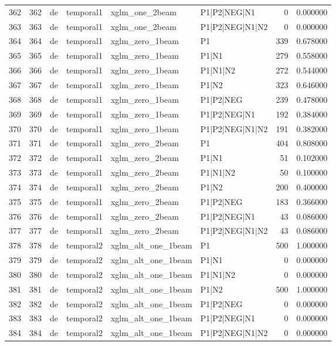 \begin{tabular}{lrllllrr}
362 & 362 & de & temporal1 & xglm_one_2beam & P1|P2|NEG|N1 & 0 & 0.000000 \\
363 & 363 & de & temporal1 & xglm_one_2beam & P1|P2|NEG|N1|N2 & 0 & 0.000000 \\
364 & 364 & de & temporal1 & xglm_zero_1beam & P1 & 339 & 0.678000 \\
365 & 365 & de & temporal1 & xglm_zero_1beam & P1|N1 & 279 & 0.558000 \\
366 & 366 & de & temporal1 & xglm_zero_1beam & P1|N1|N2 & 272 & 0.544000 \\
367 & 367 & de & temporal1 & xglm_zero_1beam & P1|N2 & 323 & 0.646000 \\
368 & 368 & de & temporal1 & xglm_zero_1beam & P1|P2|NEG & 239 & 0.478000 \\
369 & 369 & de & temporal1 & xglm_zero_1beam & P1|P2|NEG|N1 & 192 & 0.384000 \\
370 & 370 & de & temporal1 & xglm_zero_1beam & P1|P2|NEG|N1|N2 & 191 & 0.382000 \\
371 & 371 & de & temporal1 & xglm_zero_2beam & P1 & 404 & 0.808000 \\
372 & 372 & de & temporal1 & xglm_zero_2beam & P1|N1 & 51 & 0.102000 \\
373 & 373 & de & temporal1 & xglm_zero_2beam & P1|N1|N2 & 50 & 0.100000 \\
374 & 374 & de & temporal1 & xglm_zero_2beam & P1|N2 & 200 & 0.400000 \\
375 & 375 & de & temporal1 & xglm_zero_2beam & P1|P2|NEG & 183 & 0.366000 \\
376 & 376 & de & temporal1 & xglm_zero_2beam & P1|P2|NEG|N1 & 43 & 0.086000 \\
377 & 377 & de & temporal1 & xglm_zero_2beam & P1|P2|NEG|N1|N2 & 43 & 0.086000 \\
378 & 378 & de & temporal2 & xglm_alt_one_1beam & P1 & 500 & 1.000000 \\
379 & 379 & de & temporal2 & xglm_alt_one_1beam & P1|N1 & 0 & 0.000000 \\
380 & 380 & de & temporal2 & xglm_alt_one_1beam & P1|N1|N2 & 0 & 0.000000 \\
381 & 381 & de & temporal2 & xglm_alt_one_1beam & P1|N2 & 500 & 1.000000 \\
382 & 382 & de & temporal2 & xglm_alt_one_1beam & P1|P2|NEG & 0 & 0.000000 \\
383 & 383 & de & temporal2 & xglm_alt_one_1beam & P1|P2|NEG|N1 & 0 & 0.000000 \\
384 & 384 & de & temporal2 & xglm_alt_one_1beam & P1|P2|NEG|N1|N2 & 0 & 0.000000 \\

\end{tabular}
